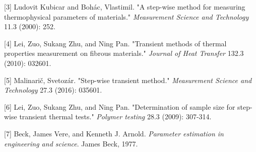 \documentclass[]{article}
\begin{document}
{[}3{]} Ludovit Kubicar and Bohác, Vlastimil. "A step-wise method for
measuring thermophysical parameters of materials." \emph{Measurement
Science and Technology} 11.3 (2000): 252.

{[}4{]} Lei, Zuo, Sukang Zhu, and Ning Pan. "Transient methods of
thermal properties measurement on fibrous materials." \emph{Journal of
Heat Transfer} 132.3 (2010): 032601.

{[}5{]} Malinarič, Svetozár. "Step-wise transient method."
\emph{Measurement Science and Technology} 27.3 (2016): 035601.

{[}6{]} Lei, Zuo, Sukang Zhu, and Ning Pan. "Determination of sample
size for step-wise transient thermal tests." \emph{Polymer testing} 28.3
(2009): 307-314.

{[}7{]} Beck, James Vere, and Kenneth J. Arnold. \emph{Parameter
estimation in engineering and science}. James Beck, 1977.
\end{document}

